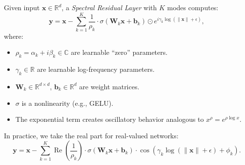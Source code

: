 \begin{definition}
  Given input $\mathbf{x} \in \mathbb{R}^d$, a \emph{Spectral Residual Layer} with $K$ modes computes:
  \begin{equation}
    \mathbf{y} = \mathbf{x} - \sum_{k=1}^{K} \frac{1}{\rho_k} \cdot \sigma\left(\mathbf{W}_k \mathbf{x} + \mathbf{b}_k\right) \odot e^{i \gamma_k \log(\|\mathbf{x}\| + \epsilon)},
  \end{equation}
  where:
  \begin{itemize}
    \item $\rho_k = \alpha_k + i\beta_k \in \mathbb{C}$ are learnable ``zero'' parameters.
    \item $\gamma_k \in \mathbb{R}$ are learnable log-frequency parameters.
    \item $\mathbf{W}_k \in \mathbb{R}^{d \times d}$, $\mathbf{b}_k \in \mathbb{R}^d$ are weight matrices.
    \item $\sigma$ is a nonlinearity (e.g., GELU).
    \item The exponential term creates oscillatory behavior analogous to $x^\rho = e^{\rho \log x}$.
  \end{itemize}
\end{definition}

In practice, we take the real part for real-valued networks:
\begin{equation}
  \mathbf{y} = \mathbf{x} - \sum_{k=1}^{K} \operatorname{Re}\left(\frac{1}{\rho_k}\right) \cdot \sigma(\mathbf{W}_k \mathbf{x} + \mathbf{b}_k) \cdot \cos\left(\gamma_k \log(\|\mathbf{x}\| + \epsilon) + \phi_k\right).
\end{equation}

